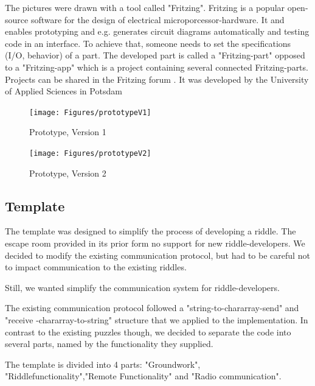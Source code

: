 The pictures were drawn with a tool called "Fritzing". 
Fritzing is a popular open-source software for the design of electrical microporcessor-hardware.
It and enables prototyping and e.g. generates circuit diagrams automatically and testing code in an interface. 
To achieve that, someone needs to set the specifications (I/O, behavior) of a part. 
The developed part is called a "Fritzing-part" opposed to a "Fritzing-app" which is a project containing several connected Fritzing-parts. 
Projects can be shared in the Fritzing forum \parencite{fritzingForum}. It was developed by the University of Applied Sciences in Potsdam

\begin{figure}[H]
	\centering
	\texttt{[image: Figures/prototypeV1]}
	\decoRule
	\caption[First Version of the Prototype]{Prototype, Version 1}
	\label{fig:prototypeV1}
\end{figure}


\begin{figure}[H]
	\centering
	\texttt{[image: Figures/prototypeV2]}
	\decoRule
	\caption[Second Version of the Prototype]{Prototype, Version 2}
	\label{fig:prototypeV2}
\end{figure}

\subsection{Template}

The template was designed to simplify the process of developing a riddle.
The escape room provided in its prior form no support for new riddle-developers.
We decided to modify the existing communication protocol, 
but had to be careful not to impact communication to the existing riddles.

Still, we wanted simplify the communication system for riddle-developers.

The existing communication protocol followed a "string-to-chararray-send" and "receive -chararray-to-string" structure that we applied to the implementation.
In contrast to the existing puzzles though, we decided to separate the code into several parts, named by the functionality they supplied.

The template is divided into 4 parts: "Groundwork", "Riddlefunctionality","Remote Functionality" and "Radio communication".


